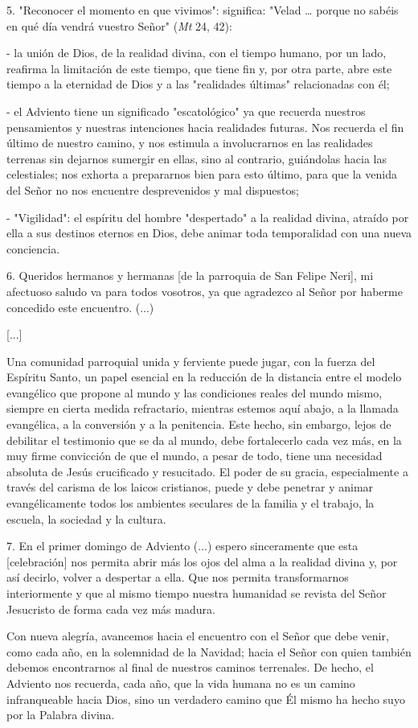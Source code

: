 \begin{body}
	5. "Reconocer el momento en que vivimos": significa: "Velad \ldots{} porque no sabéis en qué día vendrá vuestro Señor" (\emph{Mt} 24, 42):
	
	- la unión de Dios, de la realidad divina, con el tiempo humano, por un lado, reafirma la limitación de este tiempo, que tiene fin y, por otra parte, abre este tiempo a la eternidad de Dios y a las "realidades últimas" relacionadas con él;
	
	- el Adviento tiene un significado "escatológico" ya que recuerda nuestros pensamientos y nuestras intenciones hacia realidades futuras. Nos recuerda el fin último de nuestro camino, y nos estimula a involucrarnos en las realidades terrenas sin dejarnos sumergir en ellas, sino al contrario, guiándolas hacia las celestiales; nos exhorta a prepararnos bien para esto último, para que la venida del Señor no nos encuentre desprevenidos y mal dispuestos;
	
	- "Vigilidad": el espíritu del hombre "despertado" a la realidad divina, atraído por ella a sus destinos eternos en Dios, debe animar toda temporalidad con una nueva conciencia.
	
	6. Queridos hermanos y hermanas {[}de la parroquia de San Felipe Neri{]}, mi afectuoso saludo va para todos vosotros, ya que agradezco al Señor por haberme concedido este encuentro. (...)
	
	{[}...{]}
	
	Una comunidad parroquial unida y ferviente puede jugar, con la fuerza del Espíritu Santo, un papel esencial en la reducción de la distancia entre el modelo evangélico que propone al mundo y las condiciones reales del mundo mismo, siempre en cierta medida refractario, mientras estemos aquí abajo, a la llamada evangélica, a la conversión y a la penitencia. Este hecho, sin embargo, lejos de debilitar el testimonio que se da al mundo, debe fortalecerlo cada vez más, en la muy firme convicción de que el mundo, a pesar de todo, tiene una necesidad absoluta de Jesús crucificado y resucitado. El poder de su gracia, especialmente a través del carisma de los laicos cristianos, puede y debe penetrar y animar evangélicamente todos los ambientes seculares de la familia y el trabajo, la escuela, la sociedad y la cultura.
	
	7. En el primer domingo de Adviento (...) espero sinceramente que esta {[}celebración{]} nos permita abrir más los ojos del alma a la realidad divina y, por así decirlo, volver a despertar a ella. Que nos permita transformarnos interiormente y que al mismo tiempo nuestra humanidad se revista del Señor Jesucristo de forma cada vez más madura.
	
	Con nueva alegría, avancemos hacia el encuentro con el Señor que debe venir, como cada año, en la solemnidad de la Navidad; hacia el Señor con quien también debemos encontrarnos al final de nuestros caminos terrenales. De hecho, el Adviento nos recuerda, cada año, que la vida humana no es un camino infranqueable hacia Dios, sino un verdadero camino que Él mismo ha hecho suyo por la Palabra divina. 
\end{body}

